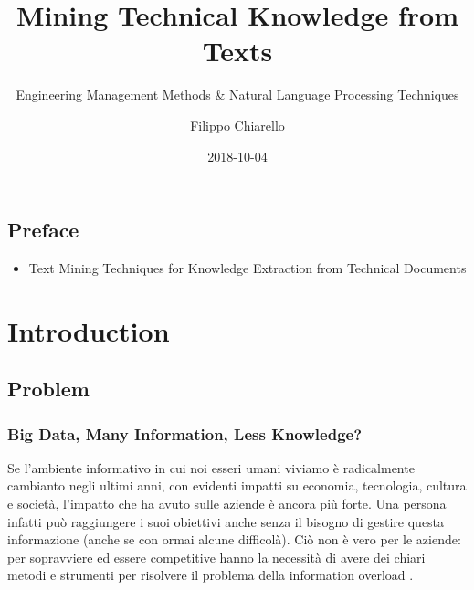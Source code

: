 \documentclass[]{book}
\title{Mining Technical Knowledge from Texts}
\subtitle{Engineering Management Methods \& Natural Language Processing Techniques}
\author{Filippo Chiarello}
\date{2018-10-04}
\providecommand{\tightlist}{%
  \setlength{\itemsep}{0pt}\setlength{\parskip}{0pt}}
\begin{document}
\maketitle

{
\setcounter{tocdepth}{1}
\tableofcontents
}
\chapter*{Preface}\label{preface}

\begin{itemize}
\tightlist
\item
  Text Mining Techniques for Knowledge Extraction from Technical
  Documents
\end{itemize}

\part{Introduction}\label{part-introduction}

\chapter{Problem}\label{problem}

\section{Big Data, Many Information, Less
Knowledge?}\label{big-data-many-information-less-knowledge}

Se l'ambiente informativo in cui noi esseri umani viviamo è radicalmente
cambianto negli ultimi anni, con evidenti impatti su economia,
tecnologia, cultura e società, l'impatto che ha avuto sulle aziende è
ancora più forte\citep[\citet{jin2015significance},
\citet{degryse2016digitalisation}, \citet{john2014big}.
\citet{o2016weapons}]{Arun2006Firm}. Una persona infatti può raggiungere
i suoi obiettivi anche senza il bisogno di gestire questa informazione
(anche se con ormai alcune difficolà). Ciò non è vero per le aziende:
per sopravviere ed essere competitive hanno la necessità di avere dei
chiari metodi e strumenti per risolvere il problema della information
overload \citep[\citet{feng2015competing}]{levitin2014organized}.
\end{document}
